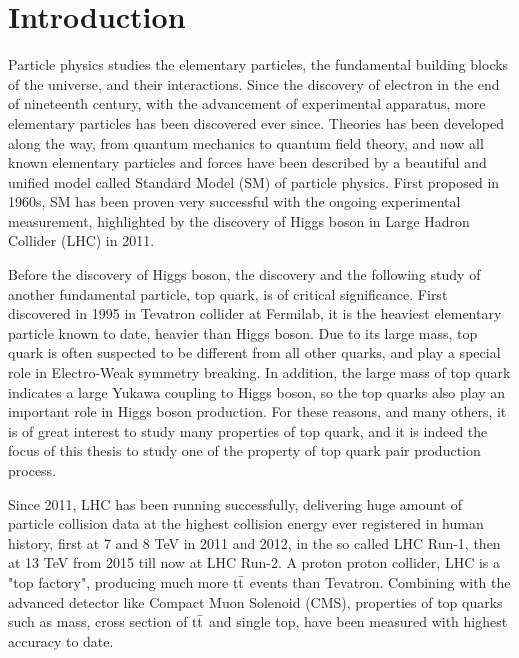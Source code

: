 \chapter*{Introduction}

Particle physics studies the elementary particles, the fundamental building blocks of the universe, and their interactions. Since the discovery of electron in the end of nineteenth century, with the advancement of  experimental apparatus, more elementary particles has been discovered ever since. Theories has been developed along the way, from quantum mechanics to quantum field theory, and now all known elementary particles and forces have been described by a beautiful and unified model called Standard Model (SM) of particle physics. First proposed in 1960s, SM has been proven very successful with the ongoing experimental measurement, highlighted by the discovery of Higgs boson in Large Hadron Collider (LHC) in 2011. 

Before the discovery of Higgs boson, the discovery and the following study of another fundamental particle, top quark, is of critical significance. First discovered in 1995 in Tevatron collider at Fermilab, it is the heaviest elementary particle known to date, heavier than Higgs boson. Due to its large mass, top quark is often suspected to be different from all other quarks, and play a special role in Electro-Weak symmetry breaking. In addition, the large mass of top quark indicates a large Yukawa coupling to Higgs boson, so the top quarks also play an important role in Higgs boson production. For these reasons, and many others, it is of great interest to study many properties of top quark, and it is indeed the focus of this thesis to study one of the property of top quark pair production process. 

Since 2011, LHC has been running successfully, delivering huge amount of particle collision data at the highest collision energy ever registered in human history, first at 7 and 8 TeV in 2011 and 2012, in the so called LHC Run-1, then at 13 TeV from 2015 till now at LHC Run-2. A proton proton collider, LHC is a "top factory", producing much more $\mathrm{t}\bar{\mathrm{t}}$ events than Tevatron. Combining with the advanced detector like Compact Muon Solenoid (CMS), properties of top quarks such as mass, cross section of $\mathrm{t}\bar{\mathrm{t}}$ and single top, have been measured with highest accuracy to date. 


